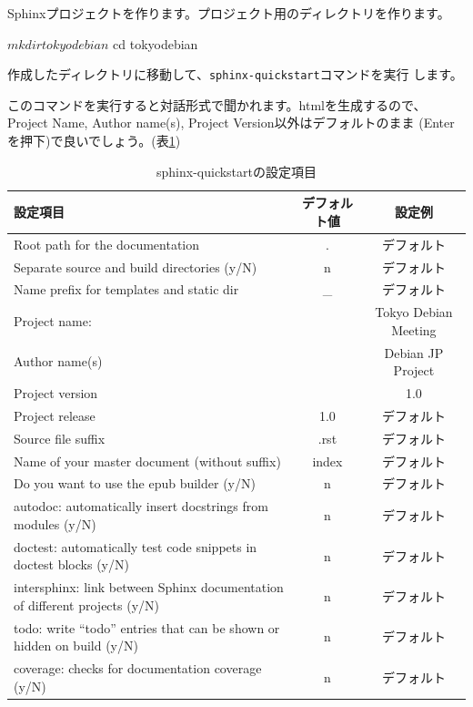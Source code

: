 \documentclass[mingoth,a4paper]{jsarticle}
\begin{document}
Sphinxプロジェクトを作ります。プロジェクト用のディレクトリを作ります。

\begin{commandline}
$ mkdir tokyodebian
$ cd tokyodebian
\end{commandline}

作成したディレクトリに移動して、\texttt{sphinx-quickstart}コマンドを実行
します。

このコマンドを実行すると対話形式で聞かれます。htmlを生成するので、
Project Name, Author name(s), Project Version以外はデフォルトのまま
(Enterを押下)で良いでしょう。(表\ref{tab:sphinx-quickstart})

\begin{table}[h]
{\scriptsize
 \caption{sphinx-quickstartの設定項目}\label{tab:sphinx-quickstart}
  \begin{tabular}{|l|c|c|}
    \hline
    設定項目 & デフォルト値 & 設定例 \\
    \hline
    Root path for the documentation & . & デフォルト \\
    Separate source and build directories (y/N) & n & デフォルト \\
    Name prefix for templates and static dir & \_ & デフォルト \\
    Project name: & & Tokyo Debian Meeting \\
    Author name(s) & & Debian JP Project \\
    Project version & & 1.0 \\
    Project release & 1.0 & デフォルト \\
    Source file suffix & .rst & デフォルト \\
    Name of your master document (without suffix) & index & デフォルト \\
    Do you want to use the epub builder (y/N) & n & デフォルト \\
    autodoc: automatically insert docstrings from modules (y/N) & n & デフォルト\\ 
    doctest: automatically test code snippets in doctest blocks (y/N) & n & デフォルト \\ 
    intersphinx: link between Sphinx documentation of different projects (y/N) & n & デフォルト \\
    todo: write ``todo'' entries that can be shown or hidden on build (y/N) & n & デフォルト \\ 
    coverage: checks for documentation coverage (y/N) & n & デフォルト\\

\end{tabular}}
\end{table}
\end{document}
